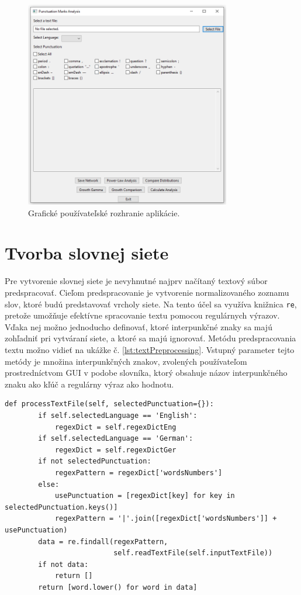 \begin{figure}
    \centerline{\includegraphics[width=0.8\textwidth]{images/gui.png}}
    \caption[Grafické používateľské rozhranie aplikácie.]{Grafické používateľské rozhranie aplikácie.}
    \label{obr:gui}
\end{figure}
 

\section{Tvorba slovnej siete}\label{sec:creationOfWordNetwork}

Pre vytvorenie slovnej siete je nevyhnutné najprv načítaný textový súbor predspracovať. Cieľom predspracovanie je
vytvorenie normalizovaného zoznamu slov, ktoré budú predstavovať vrcholy siete. Na tento účel sa využíva knižnica \texttt{re},
pretože umožňuje efektívne spracovanie textu pomocou regulárnych výrazov. Vďaka nej možno jednoducho definovať, ktoré
interpunkčné znaky sa majú zohľadniť pri vytváraní siete, a ktoré sa majú ignorovať. 
Metódu predspracovania textu možno vidieť na ukážke č. \ref{lst:textPreprocessing}. Vstupný parameter tejto metódy je
množina interpunkčných znakov, zvolených používateľom prostredníctvom GUI v podobe slovníka, ktorý obsahuje názov
interpunkčného znaku ako kľúč a regulárny výraz ako hodnotu.

\begin{lstlisting}[caption={Metóda predspracovania textu.}, label={lst:textPreprocessing}]
    def processTextFile(self, selectedPunctuation={}):
        if self.selectedLanguage == 'English':
            regexDict = self.regexDictEng
        if self.selectedLanguage == 'German':
            regexDict = self.regexDictGer
        if not selectedPunctuation:
            regexPattern = regexDict['wordsNumbers']
        else:
            usePunctuation = [regexDict[key] for key in selectedPunctuation.keys()]
            regexPattern = '|'.join([regexDict['wordsNumbers']] + usePunctuation)
        data = re.findall(regexPattern, 
                          self.readTextFile(self.inputTextFile))
        if not data:
            return []
        return [word.lower() for word in data]
\end{lstlisting}

